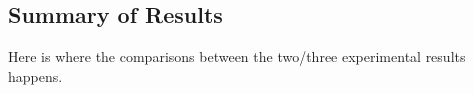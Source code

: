 \subsection{Summary of Results}
\label{sec:sum}

Here is where the comparisons between the two/three experimental
results happens.
